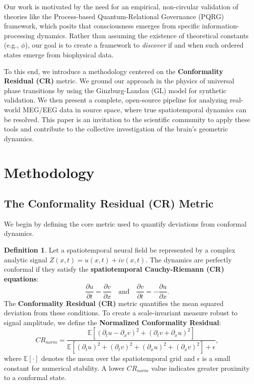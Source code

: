 \documentclass[12pt, reqno]{amsart}
\theoremstyle{definition}
\newtheorem{definition}[theorem]{Definition}
\theoremstyle{remark}
\numberwithin{equation}{section}
\begin{document}
Our work is motivated by the need for an empirical, non-circular validation of theories like the Process-based Quantum-Relational Governance (PQRG) framework, which posits that consciousness emerges from specific information-processing dynamics. Rather than assuming the existence of theoretical constants (e.g., $\phi$), our goal is to create a framework to \textit{discover} if and when such ordered states emerge from biophysical data.

To this end, we introduce a methodology centered on the \textbf{Conformality Residual (CR)} metric. We ground our approach in the physics of universal phase transitions by using the Ginzburg-Landau (GL) model for synthetic validation. We then present a complete, open-source pipeline for analyzing real-world MEG/EEG data in source space, where true spatiotemporal dynamics can be resolved. This paper is an invitation to the scientific community to apply these tools and contribute to the collective investigation of the brain's geometric dynamics.

\section{Methodology}

\subsection{The Conformality Residual (CR) Metric}
We begin by defining the core metric used to quantify deviations from conformal dynamics.

\begin{definition}
Let a spatiotemporal neural field be represented by a complex analytic signal $Z(x,t) = u(x,t) + iv(x,t)$. The dynamics are perfectly conformal if they satisfy the \textbf{spatiotemporal Cauchy-Riemann (CR) equations}:
\begin{equation}\label{eq:CR_eqs}
\frac{\partial u}{\partial t} = \frac{\partial v}{\partial x} \quad \text{and} \quad \frac{\partial v}{\partial t} = -\frac{\partial u}{\partial x}.
\end{equation}
The \textbf{Conformality Residual (CR)} metric quantifies the mean squared deviation from these conditions. To create a scale-invariant measure robust to signal amplitude, we define the \textbf{Normalized Conformality Residual}:
\begin{equation}\label{eq:CR_norm}
CR_{norm} = \frac{\mathbb{E}\left[ (\partial_t u - \partial_x v)^2 + (\partial_t v + \partial_x u)^2 \right]}{\mathbb{E}\left[ (\partial_t u)^2 + (\partial_t v)^2 + (\partial_x u)^2 + (\partial_x v)^2 \right] + \epsilon},
\end{equation}
where $\mathbb{E}[\cdot]$ denotes the mean over the spatiotemporal grid and $\epsilon$ is a small constant for numerical stability. A lower $CR_{norm}$ value indicates greater proximity to a conformal state.
\end{definition}
\end{document}
